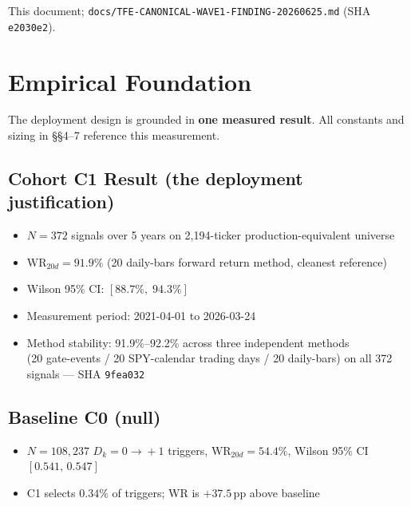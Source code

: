 \documentclass[11pt,a4paper]{article}
\newcommand{\statusblocked}{\textcolor{statusnotbuilt}{\textbf{[BLOCKED]}}}
\newcommand{\sha}[1]{\texttt{\footnotesize#1}}
\begin{document}
\begin{center}
\end{center}

\begin{sourcebox}
This document; \texttt{docs/TFE-CANONICAL-WAVE1-FINDING-20260625.md} (SHA \sha{e2030e2}).
\end{sourcebox}

\section{Empirical Foundation}

The deployment design is grounded in \textbf{one measured result}. All constants and sizing in §§4--7 reference this measurement.

\subsection*{Cohort C1 Result (the deployment justification)}
\begin{itemize}
  \item $N = 372$ signals over 5 years on 2,194-ticker production-equivalent universe
  \item $\text{WR}_{20d} = \mathbf{91.9\%}$ (20 daily-bars forward return method, cleanest reference)
  \item Wilson 95\% CI: $\mathbf{[88.7\%,\; 94.3\%]}$
  \item Measurement period: 2021-04-01 to 2026-03-24
  \item Method stability: 91.9\%--92.2\% across three independent methods\\
        (20 gate-events / 20 SPY-calendar trading days / 20 daily-bars) on all 372 signals — SHA \sha{9fea032}
\end{itemize}

\subsection*{Baseline C0 (null)}
\begin{itemize}
  \item $N = 108{,}237$ $D_k{=}0\!\to\!+1$ triggers, $\text{WR}_{20d} = 54.4\%$, Wilson 95\% CI $[0.541,\,0.547]$
  \item C1 selects $0.34\%$ of triggers; WR is $+37.5$\,pp above baseline
\end{itemize}
\end{document}

